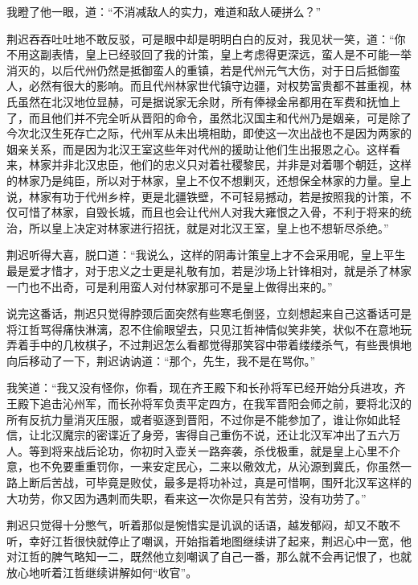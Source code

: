 我瞪了他一眼，道：“不消减敌人的实力，难道和敌人硬拼么？”

荆迟吞吞吐吐地不敢反驳，可是眼中却是明明白白的反对，我见状一笑，道：“你不用这副表情，皇上已经驳回了我的计策，皇上考虑得更深远，蛮人是不可能一举消灭的，以后代州仍然是抵御蛮人的重镇，若是代州元气大伤，对于日后抵御蛮人，必然有很大的影响。而且代州林家世代镇守边疆，对权势富贵都不甚重视，林氏虽然在北汉地位显赫，可是据说家无余财，所有俸禄金帛都用在军费和抚恤上了，而且他们并不完全听从晋阳的命令，虽然北汉国主和代州乃是姻亲，可是除了今次北汉生死存亡之际，代州军从未出境相助，即使这一次出战也不是因为两家的姻亲关系，而是因为北汉王室这些年对代州的援助让他们生出报恩之心。这样看来，林家并非北汉忠臣，他们的忠义只对着社稷黎民，并非是对着哪个朝廷，这样的林家乃是纯臣，所以对于林家，皇上不仅不想剿灭，还想保全林家的力量。皇上说，林家有功于代州乡梓，更是北疆铁壁，不可轻易撼动，若是按照我的计策，不仅可惜了林家，自毁长城，而且也会让代州人对我大雍恨之入骨，不利于将来的统治，所以皇上决定对林家进行招抚，就是对北汉王室，皇上也不想斩尽杀绝。”

荆迟听得大喜，脱口道：“我说么，这样的阴毒计策皇上才不会采用呢，皇上平生最是爱才惜才，对于忠义之士更是礼敬有加，若是沙场上针锋相对，就是杀了林家一门也不出奇，可是利用蛮人对付林家那可不是皇上做得出来的。”

说完这番话，荆迟只觉得脖颈后面突然有些寒毛倒竖，立刻想起来自己这番话可是将江哲骂得痛快淋漓，忍不住偷眼望去，只见江哲神情似笑非笑，状似不在意地玩弄着手中的几枚棋子，不过荆迟怎么看都觉得那笑容中带着缕缕杀气，有些畏惧地向后移动了一下，荆迟讷讷道：“那个，先生，我不是在骂你。”

我笑道：“我又没有怪你，你看，现在齐王殿下和长孙将军已经开始分兵进攻，齐王殿下追击沁州军，而长孙将军负责平定四方，在我军晋阳会师之前，要将北汉的所有反抗力量消灭压服，或者驱逐到晋阳，不过你是不能参加了，谁让你如此轻信，让北汉魔宗的密谍近了身旁，害得自己重伤不说，还让北汉军冲出了五六万人。等到将来战后论功，你初时入壶关一路奔袭，杀伐极重，就是皇上心里不介意，也不免要重重罚你，一来安定民心，二来以儆效尤，从沁源到冀氏，你虽然一路上断后苦战，可毕竟是败仗，最多是将功补过，真是可惜啊，围歼北汉军这样的大功劳，你又因为遇刺而失职，看来这一次你是只有苦劳，没有功劳了。”

荆迟只觉得十分憋气，听着那似是惋惜实是讥讽的话语，越发郁闷，却又不敢不听，幸好江哲很快就停止了嘲讽，开始指着地图继续讲了起来，荆迟心中一宽，他对江哲的脾气略知一二，既然他立刻嘲讽了自己一番，那么就不会再记恨了，也就放心地听着江哲继续讲解如何“收官”。

